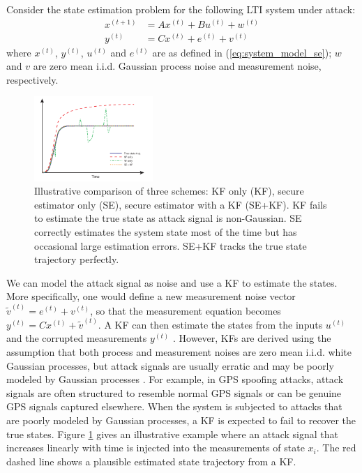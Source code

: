 \documentclass[../../thesis.tex]{subfiles}
\begin{document}
Consider the state estimation problem for the following LTI system under attack:
\begin{equation}
\begin{aligned}
x^{(t+1)} & = A x^{(t)} + B u^{(t)} + w^{(t)}\\
y^{(t)} & = C x^{(t)} + e^{(t)} + v^{(t)}
\end{aligned}
\label{eq:noise_model}
\end{equation}
where $x^{(t)}$, $y^{(t)}$, $u^{(t)}$ and $e^{(t)}$ are as defined in (\ref{eq:system_model_se});
$w$ and $v$ are zero mean i.i.d. Gaussian process noise and measurement noise, respectively. 
\begin{figure}
\center
\includegraphics[width=0.4\textwidth]{chapters/se_linear/figures/qh/est_illu.pdf}
\caption{Illustrative comparison of three schemes: KF only (KF), secure estimator only (SE), secure estimator with a KF (SE+KF). KF fails to estimate the true state as attack signal is non-Gaussian. SE correctly estimates the system state most of the time but has occasional large estimation errors. SE+KF tracks the true state trajectory perfectly.}
\label{fig:estimation}
\end{figure}
We can model the attack signal as noise and use a KF to estimate the states. More specifically, one would define a new measurement noise vector $\tilde{v}^{(t)} = e^{(t)} + v^{(t)}$, so that the measurement equation becomes $y^{(t)} = C x^{(t)} + \tilde{v}^{(t)}$. A KF can then estimate the states from the inputs $u^{(t)}$ and the corrupted measurements $y^{(t)}$ \cite{KwonACC}. However, KFs are derived using the assumption that both process and measurement noises are zero mean i.i.d. white Gaussian processes, but attack signals are usually erratic and may be poorly modeled by Gaussian processes \cite{KwonACC}. For example, in GPS spoofing attacks, attack signals are often structured to resemble normal GPS signals or can be genuine GPS signals captured elsewhere. %
When the system is subjected to attacks that are poorly modeled by Gaussian processes, a KF is expected to fail to recover the true states. Figure \ref{fig:estimation} gives an illustrative example where an attack signal that increases linearly with time is injected into the measurements of state $x_i$. The red dashed line shows a plausible estimated state trajectory from a KF.
\end{document}
